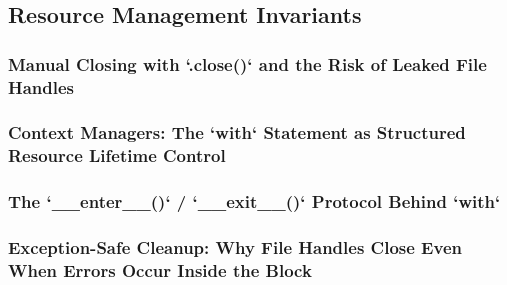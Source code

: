 \subsection{Resource Management Invariants}
\subsubsection{Manual Closing with `.close()` and the Risk of Leaked File Handles}
\subsubsection{Context Managers: The `with` Statement as Structured Resource Lifetime Control}
\subsubsection{The `__enter__()` / `__exit__()` Protocol Behind `with`}
\subsubsection{Exception-Safe Cleanup: Why File Handles Close Even When Errors Occur Inside the Block}

